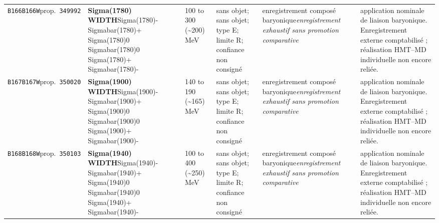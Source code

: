 \begin{landscape}
\begin{longtable}{L{1.85cm}L{4.45cm}L{2.35cm}L{4.05cm}L{3.35cm}L{7.15cm}}
\texttt{B166}\newline \texttt{B166W}\newline prop.\ \texttt{349992} & \textbf{Sigma(1780) WIDTH}\newline Sigma(1780)- \textbar{}\allowbreak{} Sigmabar(1780)+ \textbar{}\allowbreak{} Sigma(1780)0 \textbar{}\allowbreak{} Sigmabar(1780)0 \textbar{}\allowbreak{} Sigma(1780)+ \textbar{}\allowbreak{} Sigmabar(1780)- & 100 to 300 (\textasciitilde{}200)\,MeV & sans objet; sans objet; type E; limite R; confiance non consigné & enregistrement composé baryonique\newline \emph{enregistrement exhaustif sans promotion comparative} & application nominale de liaison baryonique. Enregistrement externe comptabilisé ; réalisation HMT--MD individuelle non encore reliée. \\
\texttt{B167}\newline \texttt{B167W}\newline prop.\ \texttt{350020} & \textbf{Sigma(1900) WIDTH}\newline Sigma(1900)- \textbar{}\allowbreak{} Sigmabar(1900)+ \textbar{}\allowbreak{} Sigma(1900)0 \textbar{}\allowbreak{} Sigmabar(1900)0 \textbar{}\allowbreak{} Sigma(1900)+ \textbar{}\allowbreak{} Sigmabar(1900)- & 140 to 190 (\textasciitilde{}165)\,MeV & sans objet; sans objet; type E; limite R; confiance non consigné & enregistrement composé baryonique\newline \emph{enregistrement exhaustif sans promotion comparative} & application nominale de liaison baryonique. Enregistrement externe comptabilisé ; réalisation HMT--MD individuelle non encore reliée. \\
\texttt{B168}\newline \texttt{B168W}\newline prop.\ \texttt{350103} & \textbf{Sigma(1940) WIDTH}\newline Sigma(1940)- \textbar{}\allowbreak{} Sigmabar(1940)+ \textbar{}\allowbreak{} Sigma(1940)0 \textbar{}\allowbreak{} Sigmabar(1940)0 \textbar{}\allowbreak{} Sigma(1940)+ \textbar{}\allowbreak{} Sigmabar(1940)- & 100 to 400 (\textasciitilde{}250)\,MeV & sans objet; sans objet; type E; limite R; confiance non consigné & enregistrement composé baryonique\newline \emph{enregistrement exhaustif sans promotion comparative} & application nominale de liaison baryonique. Enregistrement externe comptabilisé ; réalisation HMT--MD individuelle non encore reliée. \\

\end{longtable}
\end{landscape}
